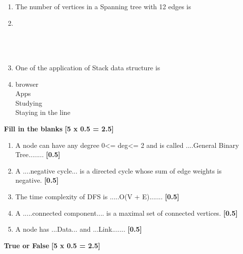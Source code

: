 \documentclass[12pt ,a4paper]{exam}
\begin{document}
\begin{enumerate}[start=1,label={\bfseries Q\arabic*)}]
     \item The number of vertices in a Spanning tree with 12 edges is 
    \item[] 
    \begin{oneparchoices}
    	\\%
    	\\
    	\\
    	 \checkmark\\
    \end{oneparchoices}
    
     \item One of the application of Stack data structure is
    \item[] 
    \begin{oneparchoices}
    	\choice browser \checkmark\\%
    	\choice Apps\\
    	\choice Studying\\
    	\choice Staying in the line\\
    \end{oneparchoices}
    \end{enumerate}
	
	\noindent \textbf{Fill in the blanks} \hfill\textbf{ [5 x 0.5 = 2.5]}
	
	\begin{enumerate}[start=11,label={\bfseries Q\arabic*)}]
		\itemsep-0.3em
		\item A node can have any degree 0<= deg<= 2 and is called ....General Binary Tree........ \hfill\textbf{ [0.5]}
		\item A ....negative cycle... is a directed cycle whose sum of edge weights is negative.  \hfill\textbf{ [0.5]}
		\item The time complexity of DFS is .....O(V + E).......  \hfill\textbf{ [0.5]}
		\item A .....connected component.... is a maximal set of connected vertices. \hfill\textbf{ [0.5]}
		\item A node has ...Data... and  ...Link....... \hfill\textbf{ [0.5]}
	\end{enumerate}
	
	\vspace{0.1mm}
	  \noindent \textbf{True or False} \hfill\textbf{ [5 x 0.5 = 2.5]}
	
\end{document}
